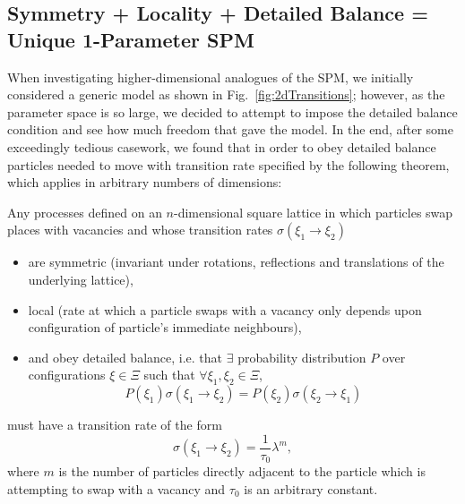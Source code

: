 \subsection{Symmetry + Locality + Detailed Balance = Unique 1-Parameter SPM}
When investigating higher-dimensional analogues of the SPM, we initially considered a generic model as shown in Fig.~\ref{fig:2dTransitions}; however, as the parameter space is so large, we decided to attempt to impose the detailed
balance condition and see how much freedom that gave the model. In the end, after some exceedingly tedious casework, we found that in order to obey detailed balance particles needed to move with transition rate
specified by the following theorem, which applies in arbitrary numbers of dimensions:
\begin{theorem}
\label{thm:ndSPM}
 Any processes defined on an $n$-dimensional square lattice in which particles swap places with vacancies and whose transition rates $\sigma(\xi_1 \rightarrow \xi_2)$
 \begin{itemize}
  \item are symmetric (invariant under rotations, reflections and translations of the underlying lattice),
  \item local (rate at which a particle swaps with a vacancy only depends upon configuration of particle's immediate neighbours),
  \item and obey detailed balance, i.e. that $\exists$ probability distribution $P$ over configurations $\xi \in \Xi$ such that $\forall \xi_1 , \xi_2 \in \Xi $,
  \begin{equation}
    P(\xi_1) \sigma(\xi_1 \rightarrow \xi_2) = P(\xi_2) \sigma(\xi_2 \rightarrow \xi_1)
  \end{equation}  
 \end{itemize}
must have a transition rate of the form
\begin{equation}
 \sigma(\xi_1 \rightarrow \xi_2) = \frac{1}{\tau_0} \lambda^m ,
\end{equation}
where $m$ is the number of particles directly adjacent to the particle which is attempting to swap with a vacancy and $\tau_0$ is an arbitrary constant.
\end{theorem}

